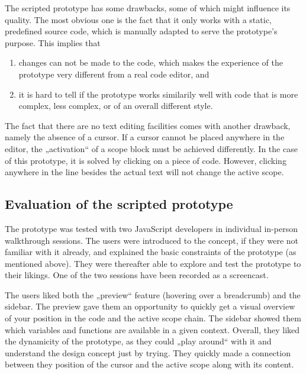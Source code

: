 The scripted prototype has some drawbacks, some of which might influence
its quality. The most obvious one is the fact that it only works with a
static, predefined source code, which is manually adapted to serve the
prototype’s purpose. This implies that

\begin{enumerate}
\def\labelenumi{\arabic{enumi}.}
\itemsep1pt\parskip0pt
\item
  changes can not be made to the code, which makes the experience of the
  prototype very different from a real code editor, and
\item
  it is hard to tell if the prototype works similarily well with code
  that is more complex, less complex, or of an overall different style.
\end{enumerate}

The fact that there are no text editing facilities comes with another
drawback, namely the absence of a cursor. If a cursor cannot be placed
anywhere in the editor, the „activation“ of a scope block must be
achieved differently. In the case of this prototype, it is solved by
clicking on a piece of code. However, clicking anywhere in the line
besides the actual text will not change the active scope.

\subsection{Evaluation of the scripted
prototype}\label{evaluation-of-the-scripted-prototype}

The prototype was tested with two JavaScript developers in individual
in-person walkthrough sessions. The users were introduced to the
concept, if they were not familiar with it already, and explained the
basic constraints of the prototype (as mentioned above). They were
thereafter able to explore and test the prototype to their likings. One
of the two sessions have been recorded as a screencast.

The users liked both the „preview“ feature (hovering over a breadcrumb)
and the sidebar. The preview gave them an opportunity to quickly get a
visual overview of your position in the code and the active scope chain.
The sidebar showed them which variables and functions are available in a
given context. Overall, they liked the dynamicity of the prototype, as
they could „play around“ with it and understand the design concept just
by trying. They quickly made a connection between they position of the
cursor and the active scope along with its content.

